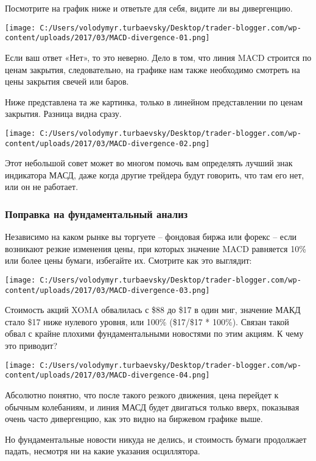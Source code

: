 \documentclass[a5paper]{article}
\begin{document}
Посмотрите на график ниже и ответьте для себя, видите ли вы дивергенцию.

\texttt{[image: C:/Users/volodymyr.turbaevsky/Desktop/trader-blogger.com/wp-content/uploads/2017/03/MACD-divergence-01.png]}

Если ваш ответ «Нет», то это неверно. Дело в том, что линия MACD строится по ценам закрытия, следовательно, на графике нам также необходимо смотреть на цены закрытия свечей или баров.

Ниже представлена та же картинка, только в линейном представлении по
ценам закрытия. Разница видна сразу.

\texttt{[image: C:/Users/volodymyr.turbaevsky/Desktop/trader-blogger.com/wp-content/uploads/2017/03/MACD-divergence-02.png]}

Этот небольшой совет может во многом помочь вам определять лучший знак
индикатора МАСД, даже когда другие трейдера будут говорить, что там
его нет, или он не работает.

\subsubsection{Поправка на фундаментальный анализ}

Независимо на каком рынке вы торгуете – фондовая биржа или форекс –
если возникают резкие изменения цены, при которых значение MACD
равняется 10\% или более цены бумаги, избегайте их. Смотрите как это
выглядит:

\texttt{[image: C:/Users/volodymyr.turbaevsky/Desktop/trader-blogger.com/wp-content/uploads/2017/03/MACD-divergence-03.png]}

Стоимость акций XOMA обвалилась с \$88 до \$17 в один миг, значение МАКД
стало \$17 ниже нулевого уровня, или 100\% (\$17/\$17 * 100\%). Связан
                                такой обвал с крайне плохими
                                фундаментальными новостями по этим
                                акциям. К чему это приводит?

\texttt{[image: C:/Users/volodymyr.turbaevsky/Desktop/trader-blogger.com/wp-content/uploads/2017/03/MACD-divergence-04.png]}

Абсолютно понятно, что после такого резкого движения, цена перейдет к обычным колебаниям, и линия МАСД будет двигаться только вверх, показывая очень часто дивергенцию, как это видно на биржевом графике выше.

Но фундаментальные новости никуда не делись, и стоимость бумаги продолжает падать, несмотря ни на какие указания осциллятора.
\end{document}
